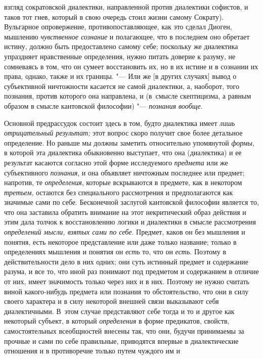 взгляд сократовской диалектики, направленной против диалектики софистов, и
таков тот гнев, который в свою очередь стоил жизни самому Сократу).
Вульгарное опровержение, противопоставляющее, как это сделал Диоген,
мышлению {\em чувственное сознание}
и полагающее, что в последнем оно обретает истину, должно
быть предоставлено самому себе; поскольку же диалектика упраздняет
нравственные определения, нужно питать доверие к разуму, не сомневаясь в
том, что он сумеет восстановить их, но в их истине и в сознании их права,
однако, также и их границы. "--- Или же [в других случаях]
вывод о субъективной ничтожности касается не самой диалектики, а, наоборот,
того познания, против которого она направлена, и (в~смысле скептицизма, а
равным образом в смысле кантовской философии) "--- {\em познания вообще}.

Основной предрассудок состоит здесь в том, будто диалектика
имеет {\em лишь отрицательный
результат;} этот вопрос скоро получит свое более детальное
определение. Но раньше мы должны заметить относительно упомянутой
{\em формы}, в которой
эта диалектика обыкновенно выступает, что она (диалектика) и ее результат
касаются согласно этой форме исследуемого {\em предмета} или же
субъективного {\em познания}, и она объявляет ничтожным последнее или
предмет; напротив, те {\em определения},
которые вскрываются в предмете, как в некотором {\em третьем}, остаются
без специального рассмотрения и предполагаются как значимые сами по себе.
\label{bkm:bm126a}Бесконечной заслугой кантовской философии
является то, что она заставила обратить внимание на этот некритический
образ действия и этим дала толчок к восстановлению логики и диалектики в
смысле рассмотрения {\em определений
мысли, взятых сами по себе}. Предмет, каков он без мышления
и понятия, есть некоторое представление или даже только название; только в
определениях мышления и понятия он {\em есть} то, что он {\em есть}. Поэтому
в действительности дело в них одних; они суть истинный предмет и содержание
разума, и все то, что иной раз понимают под предметом и содержанием в
отличие от них, имеет значимость только через них и в них. Поэтому не нужно
считать виной какого-нибудь предмета или познания то обстоятельство, что
они в силу своего характера и в силу некоторой внешней связи выказывают
себя диалектичными. В~этом случае представляют себе тогда и то и другое как
некоторый субъект, в который {\em определения} в форме
предикатов, свойств, самостоятельных всеобщностей внесены так, что они,
будучи принимаемы за прочные и сами по себе правильные, приводятся впервые
в диалектические отношения и в противоречие только путем чуждого им и

